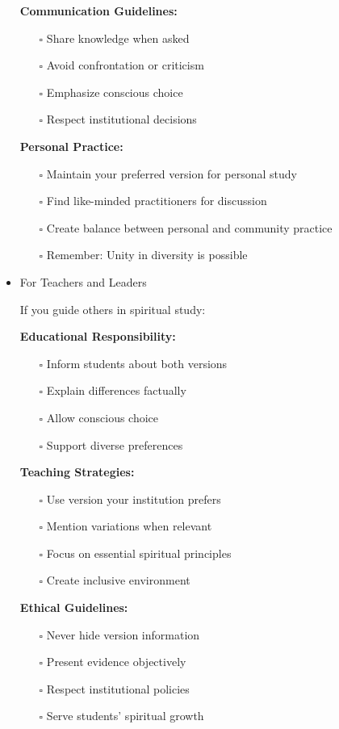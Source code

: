 \documentclass[11pt,twoside]{book}
\begin{document}
\begin{itemize}
\textbf{\textbf{Communication Guidelines:}}
\begin{itemize}
\item[{$\square$}] Share knowledge when asked
\item[{$\square$}] Avoid confrontation or criticism
\item[{$\square$}] Emphasize conscious choice
\item[{$\square$}] Respect institutional decisions
\end{itemize}

\textbf{\textbf{Personal Practice:}}
\begin{itemize}
\item[{$\square$}] Maintain your preferred version for personal study
\item[{$\square$}] Find like-minded practitioners for discussion
\item[{$\square$}] Create balance between personal and community practice
\item[{$\square$}] Remember: Unity in diversity is possible
\end{itemize}
\item For Teachers and Leaders
\label{sec:orgbd06572}

If you guide others in spiritual study:

\textbf{\textbf{Educational Responsibility:}}
\begin{itemize}
\item[{$\square$}] Inform students about both versions
\item[{$\square$}] Explain differences factually
\item[{$\square$}] Allow conscious choice
\item[{$\square$}] Support diverse preferences
\end{itemize}

\textbf{\textbf{Teaching Strategies:}}
\begin{itemize}
\item[{$\square$}] Use version your institution prefers
\item[{$\square$}] Mention variations when relevant
\item[{$\square$}] Focus on essential spiritual principles
\item[{$\square$}] Create inclusive environment
\end{itemize}

\textbf{\textbf{Ethical Guidelines:}}
\begin{itemize}
\item[{$\square$}] Never hide version information
\item[{$\square$}] Present evidence objectively
\item[{$\square$}] Respect institutional policies
\item[{$\square$}] Serve students' spiritual growth
\end{itemize}
\end{itemize}
\end{document}
